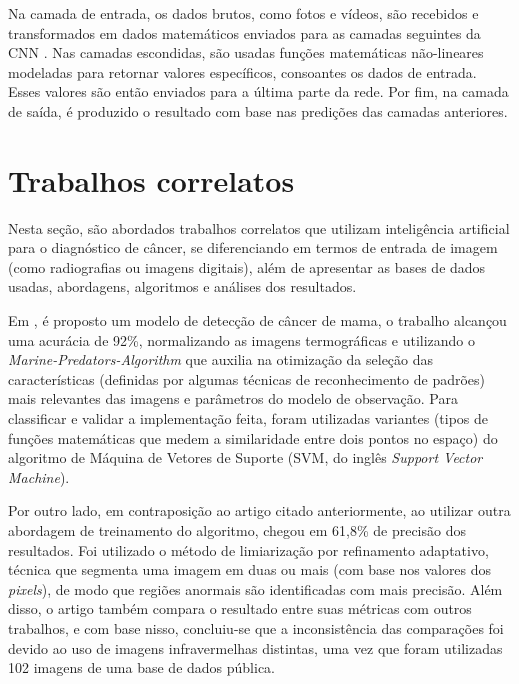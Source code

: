 Na camada de entrada, os dados brutos, como fotos e vídeos, são recebidos e transformados em dados matemáticos enviados para as camadas seguintes da CNN \cite{cnn}. Nas camadas escondidas, são usadas funções matemáticas não-lineares modeladas para retornar valores específicos, consoantes os dados de entrada. Esses valores são então enviados para a última parte da rede. Por fim, na camada de saída, é produzido o resultado com base nas predições das camadas anteriores.







\section{\esp Trabalhos correlatos} \label{trabcorr}

Nesta seção, são abordados trabalhos correlatos que utilizam inteligência artificial para o diagnóstico de câncer, se diferenciando em termos de entrada de imagem (como radiografias ou imagens digitais), além de apresentar as bases de dados usadas, abordagens, algoritmos e análises dos resultados. 

Em , é proposto um modelo de detecção de câncer de mama, o trabalho alcançou uma acurácia de 92\%, normalizando as imagens termográficas e utilizando o \textit{Marine-Predators-Algorithm} que auxilia na otimização da seleção das características (definidas por algumas técnicas de reconhecimento de padrões) mais relevantes das imagens e parâmetros do modelo de observação. Para classificar e validar a implementação feita, foram utilizadas variantes (tipos de funções matemáticas que medem a similaridade entre dois pontos no espaço) do algoritmo de Máquina de Vetores de Suporte (SVM, do inglês \textit{Support Vector Machine}).

Por outro lado, em contraposição ao artigo citado anteriormente,  ao utilizar outra abordagem de treinamento do algoritmo, chegou em 61,8\% de precisão dos resultados. Foi utilizado o método de limiarização por refinamento adaptativo, técnica que segmenta uma imagem em duas ou mais (com base nos valores dos \textit{pixels}), de modo que regiões anormais são identificadas com mais precisão. Além disso, o artigo também compara o resultado entre suas métricas com outros trabalhos, e com base nisso, concluiu-se que a inconsistência das comparações foi devido ao uso de imagens infravermelhas distintas, uma vez que foram utilizadas 102 imagens de uma base de dados pública.

